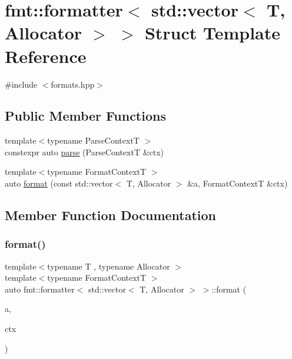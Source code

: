 \hypertarget{structfmt_1_1formatter_3_01std_1_1vector_3_01_t_00_01_allocator_01_4_01_4}{}\section{fmt\+:\+:formatter$<$ std\+:\+:vector$<$ T, Allocator $>$ $>$ Struct Template Reference}
\label{structfmt_1_1formatter_3_01std_1_1vector_3_01_t_00_01_allocator_01_4_01_4}


{\ttfamily \#include $<$formats.\+hpp$>$}

\subsection*{Public Member Functions}
\begin{DoxyCompactItemize}
\item 
{\footnotesize template$<$typename Parse\+ContextT $>$ }\\constexpr auto \mbox{\hyperlink{structfmt_1_1formatter_3_01std_1_1vector_3_01_t_00_01_allocator_01_4_01_4_ac8c36547961c3a5d1a4c9ab005bef400}{parse}} (Parse\+ContextT \&ctx)
\item 
{\footnotesize template$<$typename Format\+ContextT $>$ }\\auto \mbox{\hyperlink{structfmt_1_1formatter_3_01std_1_1vector_3_01_t_00_01_allocator_01_4_01_4_adf976e467856d81ae4c470c85e02432e}{format}} (const std\+::vector$<$ T, Allocator $>$ \&a, Format\+ContextT \&ctx)
\end{DoxyCompactItemize}


\subsection{Member Function Documentation}
\mbox{\label{structfmt_1_1formatter_3_01std_1_1vector_3_01_t_00_01_allocator_01_4_01_4_adf976e467856d81ae4c470c85e02432e}} 
\subsubsection{\texorpdfstring{format()}{format()}}
{\footnotesize\ttfamily template$<$typename T , typename Allocator $>$ \\
template$<$typename Format\+ContextT $>$ \\
auto fmt\+::formatter$<$ std\+::vector$<$ T, Allocator $>$ $>$\+::format (\begin{DoxyParamCaption}\item[{const std\+::vector$<$ T, Allocator $>$ \&}]{a,  }\item[{Format\+ContextT \&}]{ctx }\end{DoxyParamCaption})}

